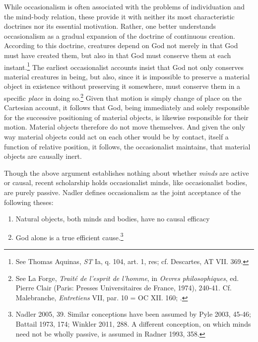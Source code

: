 \documentclass{article}
\begin{document}
While occasionalism is often associated with the problems of
individuation and the mind-body relation, these provide it with neither
its most characteristic doctrines nor its essential motivation. Rather,
one better understands occasionalism as a gradual expansion of the
doctrine of continuous creation. According to this doctrine, creatures
depend on God not merely in that God must have created them, but also in
that God must conserve them at each instant.\footnote{See Thomas
  Aquinas, \emph{ST} Ia, q. 104, art. 1, res; cf. Descartes, AT VII.
  369.} The earliest occasionalist accounts insist that God not only
conserves material creatures in being, but also, since it is impossible
to preserve a material object in existence without preserving it
somewhere, must conserve them in a specific \emph{place} in doing
so.\footnote{See La Forge, \emph{Traité de l'esprit de l'homme}, in
  \emph{Oevres philosophiques}, ed. Pierre Clair (Paris: Presses
  Universitaires de France, 1974), 240-41. Cf. Malebranche,
  \emph{Entretiens} VII, par. 10 = OC XII. 160; \autocite{Nadler1998}.} Given that
motion is simply change of place on the Cartesian account, it follows
that God, being immediately and solely responsible for the successive
positioning of material objects, is likewise responsible for their
motion. Material objects therefore do not move themselves. And given the
only way material objects could act on each other would be by contact,
itself a function of relative position, it follows, the occasionalist
maintains, that material objects are causally inert.

Though the above argument establishes nothing about whether \emph{minds}
are active or causal, recent scholarship holds occasionalist minds, like
occasionalist bodies, are purely passive. Nadler defines occasionalism
as the joint acceptance of the following theses:

\begin{enumerate}
\item
  Natural objects, both minds and bodies, have no causal efficacy
\item
  God alone is a true efficient cause.\footnote{Nadler 2005, 39. Similar
    conceptions have been assumed by Pyle 2003, 45-46; Battail 1973,
    174; Winkler 2011, 288. A different conception, on which minds need
    not be wholly passive, is assumed in Radner 1993, 358.}
\end{enumerate}
\end{document}
